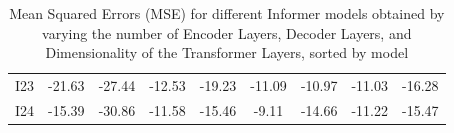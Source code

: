 \begin{table}[]
{\begin{tabular}{ccccccccc}
    I23   & \cellcolor[HTML]{A1D07E}-21.63 & \cellcolor[HTML]{FFDF82}-27.44 & \cellcolor[HTML]{EAE582}-12.53 & \cellcolor[HTML]{C8DB80}-19.23 & \cellcolor[HTML]{FFDE82}-11.09 & \cellcolor[HTML]{F8696B}-10.97 & \cellcolor[HTML]{F8696B}-11.03 & \cellcolor[HTML]{FBEA83}-16.28 \\
    I24   & \cellcolor[HTML]{F8696B}-15.39 & \cellcolor[HTML]{B6D67F}-30.86 & \cellcolor[HTML]{F9786E}-11.58 & \cellcolor[HTML]{F1E783}-15.46 & \cellcolor[HTML]{F8696B}-9.11  & \cellcolor[HTML]{FEC97E}-14.66 & \cellcolor[HTML]{F9736D}-11.22 & \cellcolor[HTML]{FCAB78}-15.47
    \end{tabular}%
    }
    \caption{Mean Squared Errors (MSE) for different Informer models obtained by varying the number of Encoder Layers, Decoder Layers, and Dimensionality of the Transformer Layers, sorted by model}
    \label{I4_M}
    \end{table}


    


